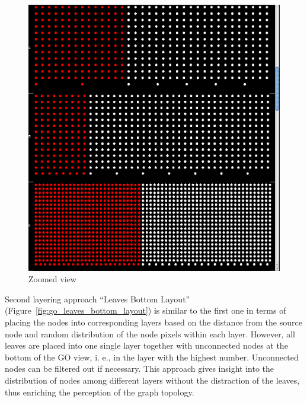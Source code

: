 \begin{figure}[h!]
\centering
\includegraphics[scale=0.3]{pictures/go_levels_layout_zoomed.png}
\caption{Zoomed view}
\label{fig:go_levels_layout_zoomed}
\end{figure}

Second layering approach ``Leaves Bottom Layout''
(Figure~\ref{fig:go_leaves_bottom_layout}) is similar to the first one in terms of placing the nodes into corresponding layers based on the distance
from the source node and random distribution of the node pixels within each layer.
However, all leaves are placed into one single layer together with unconnected nodes at the bottom of the GO view, i. e., in the layer with the highest number.
Unconnected nodes can be filtered out if necessary. This approach gives insight into the distribution of nodes among different layers without the distraction of the leaves,
thus enriching the perception of the graph topology.

